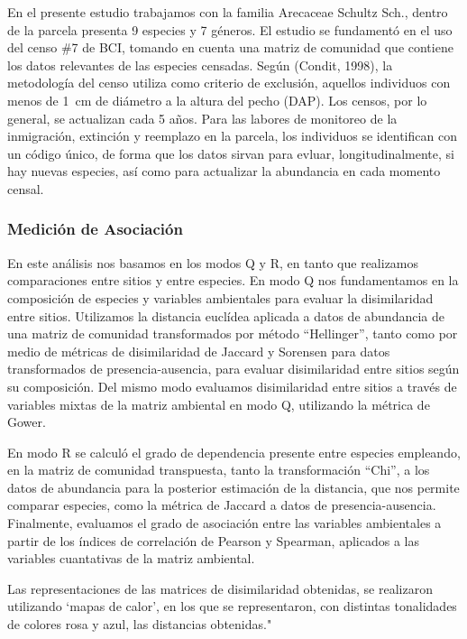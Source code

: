 \documentclass[11pt,]{article}
\begin{document}
En el presente estudio trabajamos con la familia Arecaceae Schultz Sch.,
dentro de la parcela presenta 9 especies y 7 géneros. El estudio se
fundamentó en el uso del censo \#7 de BCI, tomando en cuenta una matriz
de comunidad que contiene los datos relevantes de las especies censadas.
Según (Condit, 1998), la metodología del censo utiliza como criterio de
exclusión, aquellos individuos con menos de 1~cm de diámetro a la altura
del pecho (DAP). Los censos, por lo general, se actualizan cada 5 años.
Para las labores de monitoreo de la inmigración, extinción y reemplazo
en la parcela, los individuos se identifican con un código único, de
forma que los datos sirvan para evluar, longitudinalmente, si hay nuevas
especies, así como para actualizar la abundancia en cada momento censal.

\subsubsection{Medición de
Asociación}\label{mediciuxf3n-de-asociaciuxf3n}

En este análisis nos basamos en los modos Q y R, en tanto que realizamos
comparaciones entre sitios y entre especies. En modo Q nos fundamentamos
en la composición de especies y variables ambientales para evaluar la
disimilaridad entre sitios. Utilizamos la distancia euclídea aplicada a
datos de abundancia de una matriz de comunidad transformados por método
``Hellinger'', tanto como por medio de métricas de disimilaridad de
Jaccard y Sorensen para datos transformados de presencia-ausencia, para
evaluar disimilaridad entre sitios según su composición. Del mismo modo
evaluamos disimilaridad entre sitios a través de variables mixtas de la
matriz ambiental en modo Q, utilizando la métrica de Gower.

En modo R se calculó el grado de dependencia presente entre especies
empleando, en la matriz de comunidad transpuesta, tanto la
transformación ``Chi'', a los datos de abundancia para la posterior
estimación de la distancia, que nos permite comparar especies, como la
métrica de Jaccard a datos de presencia-ausencia. Finalmente, evaluamos
el grado de asociación entre las variables ambientales a partir de los
índices de correlación de Pearson y Spearman, aplicados a las variables
cuantativas de la matriz ambiental.

Las representaciones de las matrices de disimilaridad obtenidas, se
realizaron utilizando `mapas de calor', en los que se representaron, con
distintas tonalidades de colores rosa y azul, las distancias obtenidas."
\end{document}
